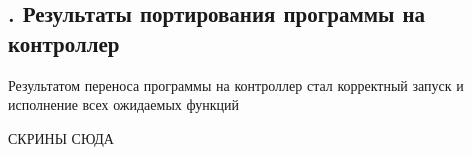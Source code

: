\subsection*{ 
	\gostTitleFont
	\redline
	\thechaptercntr .\thesubchaptercntr \spc
	Результаты портирования программы на контроллер
} \addtocounter{subchaptercntr}{1}

\subtitlespace

{\gostFont
	
	\par \redline Результатом переноса программы на контроллер стал корректный запуск и исполнение всех ожидаемых функций
	
	\par \redline СКРИНЫ СЮДА
	
	\par
}


\setcounter{subchaptercntr}{1}
\setcounter{formulacntr}{1}
\setcounter{imagecntr}{1}
\setcounter{tablecntr}{1}
\setcounter{itemcntr}{1}

